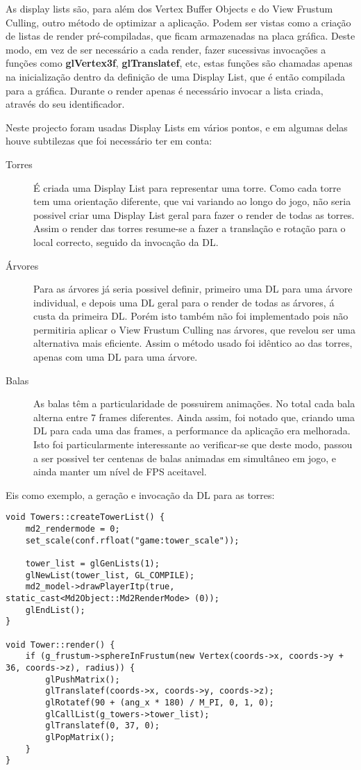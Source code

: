 As display lists são, para além dos Vertex Buffer Objects e do View Frustum Culling, outro método de optimizar a aplicação. Podem ser vistas como a criação de listas de render pré-compiladas, que ficam armazenadas na placa gráfica. Deste modo, em vez de ser necessário a cada render, fazer sucessivas invocações a funções como \textbf{glVertex3f}, \textbf{glTranslatef}, etc, estas funções são chamadas apenas na inicialização dentro da definição de uma Display List, que é então compilada para a gráfica.
Durante o render apenas é necessário invocar a lista criada, através do seu identificador.

Neste projecto foram usadas Display Lists em vários pontos, e em algumas delas houve subtilezas que foi necessário ter em conta:
\begin{description}
\item[Torres] É criada uma Display List para representar uma torre. Como cada torre tem uma orientação diferente, que vai variando ao longo do jogo, não seria possivel criar uma Display List geral para fazer o render de todas as torres. Assim o render das torres resume-se a fazer a translação e rotação para o local correcto, seguido da invocação da DL.
\item[Árvores] Para as árvores já seria possivel definir, primeiro uma DL para uma árvore individual, e depois uma DL geral para o render de todas as árvores, á custa da primeira DL.
Porém isto também não foi implementado pois não permitiria aplicar o View Frustum Culling nas árvores, que revelou ser uma alternativa mais eficiente. Assim o método usado foi idêntico ao das torres, apenas com uma DL para uma árvore.
\item[Balas] As balas têm a particularidade de possuirem animações. No total cada bala alterna entre 7 frames diferentes. Ainda assim, foi notado que, criando uma DL para cada uma das frames, a performance da aplicação era melhorada. Isto foi particularmente interessante ao verificar-se que deste modo, passou a ser possivel ter centenas de balas animadas em simultâneo em jogo, e ainda manter um nível de FPS aceitavel.
\end{description}

Eis como exemplo, a geração e invocação da DL para as torres:

\begin{lstlisting}[caption=Displays Lists para as Torres]
void Towers::createTowerList() {
    md2_rendermode = 0;
    set_scale(conf.rfloat("game:tower_scale"));
	
	tower_list = glGenLists(1);
	glNewList(tower_list, GL_COMPILE);
	md2_model->drawPlayerItp(true, static_cast<Md2Object::Md2RenderMode> (0));
	glEndList();
}

void Tower::render() {
    if (g_frustum->sphereInFrustum(new Vertex(coords->x, coords->y + 36, coords->z), radius)) {
        glPushMatrix();
        glTranslatef(coords->x, coords->y, coords->z);
        glRotatef(90 + (ang_x * 180) / M_PI, 0, 1, 0);
        glCallList(g_towers->tower_list);
        glTranslatef(0, 37, 0);
        glPopMatrix();
    }
}
\end{lstlisting}
